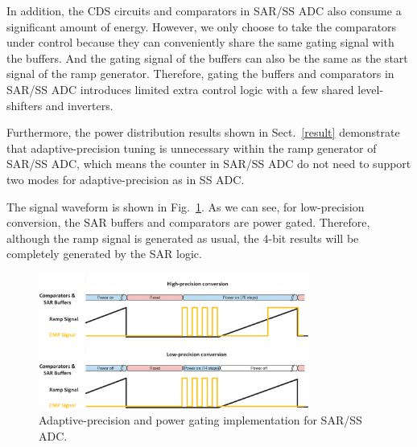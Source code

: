 In addition, the CDS circuits and comparators in SAR/SS ADC also consume a significant amount of energy. However, we only choose to take the comparators under control because they can conveniently share the same gating signal with the buffers. And the gating signal of the buffers can also be the same as the start signal of the ramp generator. Therefore, gating the buffers and comparators in SAR/SS ADC introduces limited extra control logic with a few shared level-shifters and inverters.

Furthermore, the power distribution results shown in Sect.~\ref{result} demonstrate that adaptive-precision tuning is unnecessary within the ramp generator of SAR/SS ADC, which means the counter in SAR/SS ADC do not need to support two modes for adaptive-precision as in SS ADC.

The signal waveform is shown in Fig.~\ref{SAR_pg}. As we can see, for low-precision conversion, the SAR buffers and comparators are power gated. Therefore, although the ramp signal is generated as usual, the 4-bit results will be completely generated by the SAR logic. 

\begin{figure}[htbp]
	\centerline{\includegraphics[width=3.5in]{./Figures/SAR_pg.eps}}
	\caption{Adaptive-precision and power gating implementation for SAR/SS ADC.}
	\label{SAR_pg}
\end{figure} 
